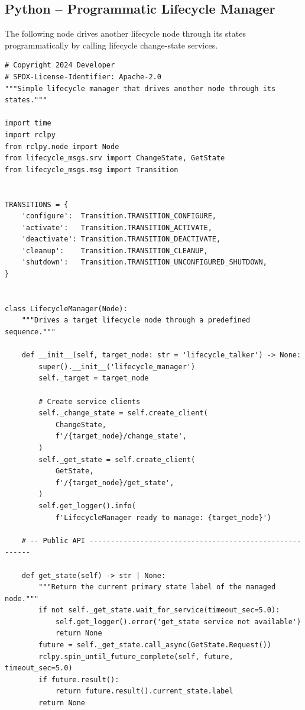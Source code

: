 \documentclass[12pt,a4paper]{article}
\begin{document}
\subsection{Python -- Programmatic Lifecycle Manager}
\label{sec:py-manager}

The following node drives another lifecycle node through its states
programmatically by calling lifecycle change-state services.

\begin{lstlisting}[style=python,caption={lifecycle\_manager.py}]
# Copyright 2024 Developer
# SPDX-License-Identifier: Apache-2.0
"""Simple lifecycle manager that drives another node through its states."""

import time
import rclpy
from rclpy.node import Node
from lifecycle_msgs.srv import ChangeState, GetState
from lifecycle_msgs.msg import Transition


TRANSITIONS = {
    'configure':  Transition.TRANSITION_CONFIGURE,
    'activate':   Transition.TRANSITION_ACTIVATE,
    'deactivate': Transition.TRANSITION_DEACTIVATE,
    'cleanup':    Transition.TRANSITION_CLEANUP,
    'shutdown':   Transition.TRANSITION_UNCONFIGURED_SHUTDOWN,
}


class LifecycleManager(Node):
    """Drives a target lifecycle node through a predefined sequence."""

    def __init__(self, target_node: str = 'lifecycle_talker') -> None:
        super().__init__('lifecycle_manager')
        self._target = target_node

        # Create service clients
        self._change_state = self.create_client(
            ChangeState,
            f'/{target_node}/change_state',
        )
        self._get_state = self.create_client(
            GetState,
            f'/{target_node}/get_state',
        )
        self.get_logger().info(
            f'LifecycleManager ready to manage: {target_node}')

    # -- Public API --------------------------------------------------------

    def get_state(self) -> str | None:
        """Return the current primary state label of the managed node."""
        if not self._get_state.wait_for_service(timeout_sec=5.0):
            self.get_logger().error('get_state service not available')
            return None
        future = self._get_state.call_async(GetState.Request())
        rclpy.spin_until_future_complete(self, future, timeout_sec=5.0)
        if future.result():
            return future.result().current_state.label
        return None


\end{lstlisting}
\end{document}
